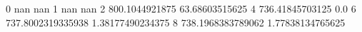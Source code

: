 0 nan nan
1 nan nan
2 800.1044921875 63.68603515625
4 736.41845703125 0.0
6 737.8002319335938 1.38177490234375
8 738.1968383789062 1.77838134765625
